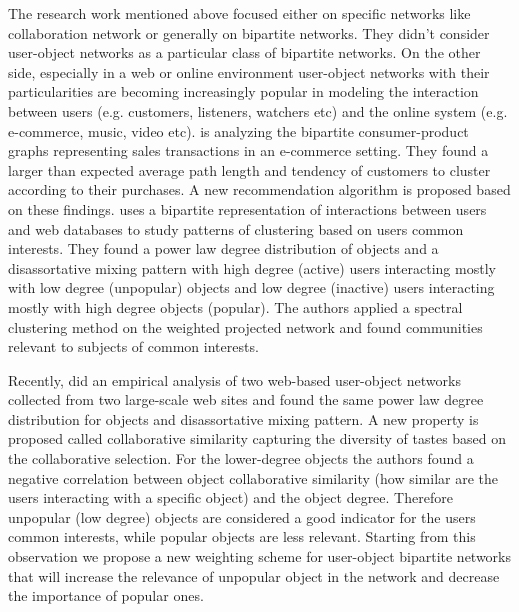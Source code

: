 The research work mentioned above focused either on specific networks like
collaboration network or generally on bipartite networks. They didn't consider
user-object networks as a particular class of bipartite networks. On the other
side, especially in a web or online environment user-object networks with their
particularities are becoming increasingly popular in modeling the interaction
between users (e.g. customers, listeners, watchers etc) and the online system
(e.g. e-commerce, music, video etc). \citet{huang2007analyzing} is analyzing the
bipartite consumer-product graphs representing sales transactions in an
e-commerce setting. They found a larger than expected average path length and
tendency of customers to cluster according to their purchases. A new
recommendation algorithm is proposed based on these findings.
\citet{grujic2009mixing} uses a bipartite representation of interactions between
users and web databases to study patterns of clustering based on users common
interests. They found a power law degree distribution of objects and a
disassortative mixing pattern with high degree (active) users interacting mostly
with low degree (unpopular) objects and low degree (inactive) users interacting
mostly with high degree objects (popular). The authors applied a spectral
clustering method on the weighted projected network and found communities
relevant to subjects of common interests.

Recently, \citet{shang10empirical} did an empirical analysis of two web-based
user-object networks collected from two large-scale web sites and found the same
power law degree distribution for objects and disassortative mixing pattern. A
new property is proposed called collaborative similarity capturing the diversity
of tastes based on the collaborative selection. For the lower-degree objects the
authors found a negative correlation between object collaborative similarity
(how similar are the users interacting with a specific object) and the object
degree. Therefore unpopular (low degree) objects are considered a good indicator
for the users common interests, while popular objects are less relevant.
Starting from this observation we propose a new weighting scheme for user-object
bipartite networks that will increase the relevance of unpopular object in the
network and decrease the importance of popular ones.
